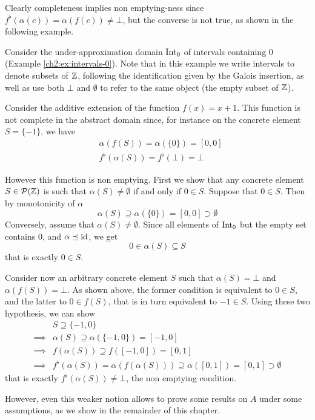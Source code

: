 Clearly completeness implies non emptying-ness since $f^{\flat}(\alpha(c)) = \alpha(f(c)) \neq \bot$, but the converse is not true, as shown in the following example.
\begin{example}\label{ch3:ex:ne-not-complete}
	Consider the under-approximation domain $\text{Int}_0$ of intervals containing $0$ (Example \ref{ch2:ex:intervals-0}). Note that in this example we write intervals to denote subsets of $\mathbb{Z}$, following the identification given by the Galois insertion, as well as use both $\bot$ and $\emptyset$ to refer to the same object (the empty subset of $\mathbb{Z}$).

	Consider the additive extension of the function $f(x) = x + 1$. This function is not complete in the abstract domain since, for instance on the concrete element $S = \{ -1 \}$, we have
	\begin{align*}
		&\alpha(f(S)) = \alpha(\{ 0 \}) = [0, 0] \\
		&f^{\flat}(\alpha(S)) = f^{\flat}(\bot) = \bot
	\end{align*}

	However this function is non emptying.
	First we show that any concrete element $S \in \mathcal{P}(\mathbb{Z})$ is such that $\alpha(S) \neq \emptyset$ if and only if $0 \in S$.
	Suppose that $0 \in S$. Then by monotonicity of $\alpha$
	\[
	\alpha(S) \supseteq \alpha(\{ 0 \}) = [0, 0] \supset \emptyset
	\]
	Conversely, assume that $\alpha(S) \neq \emptyset$. Since all elements of $\text{Int}_0$ but the empty set contains $0$, and $\alpha \preceq \text{id}$, we get
	\[
	0 \in \alpha(S) \subseteq S
	\]
	that is exactly $0 \in S$.

	Consider now an arbitrary concrete element $S$ such that $\alpha(S) = \bot$ and $\alpha(f(S)) = \bot$. As shown above, the former condition is equivalent to $0 \in S$, and the latter to $0 \in f(S)$, that is in turn equivalent to $-1 \in S$. Using these two hypothesis, we can show
	\begin{align*}
		&S \supseteq \{ -1, 0 \} \\
		\implies& \alpha(S) \supseteq \alpha(\{ -1, 0 \}) = [-1, 0] \\
		\implies& f(\alpha(S)) \supseteq f([-1, 0]) = [0, 1] \\
		\implies& f^{\flat}(\alpha(S)) = \alpha(f(\alpha(S))) \supseteq \alpha([0, 1]) = [0, 1] \supset \emptyset
	\end{align*}
	that is exactly $f^{\flat}(\alpha(S)) \neq \bot$, the non emptying condition.
\end{example}
However, even this weaker notion allows to prove some results on $A$ under some assumptions, as we show in the remainder of this chapter.

